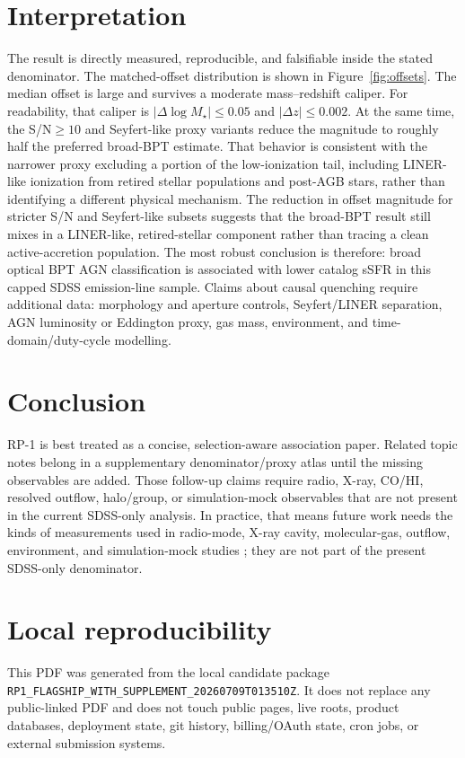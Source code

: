\documentclass[twocolumn]{aastex631}
\begin{document}
\section{Interpretation}
The result is directly measured, reproducible, and falsifiable inside the stated denominator. The matched-offset distribution is shown in Figure~\ref{fig:offsets}. The median offset is large and survives a moderate mass--redshift caliper. For readability, that caliper is $|\Delta\log M_\star|\leq0.05$ and $|\Delta z|\leq0.002$. At the same time, the S/N$\geq10$ and Seyfert-like proxy variants reduce the magnitude to roughly half the preferred broad-BPT estimate. That behavior is consistent with the narrower proxy excluding a portion of the low-ionization tail, including LINER-like ionization from retired stellar populations and post-AGB stars, rather than identifying a different physical mechanism. The reduction in offset magnitude for stricter S/N and Seyfert-like subsets suggests that the broad-BPT result still mixes in a LINER-like, retired-stellar component rather than tracing a clean active-accretion population. The most robust conclusion is therefore: broad optical BPT AGN classification is associated with lower catalog sSFR in this capped SDSS emission-line sample. Claims about causal quenching require additional data: morphology and aperture controls, Seyfert/LINER separation, AGN luminosity or Eddington proxy, gas mass, environment, and time-domain/duty-cycle modelling.

\section{Conclusion}
RP-1 is best treated as a concise, selection-aware association paper. Related topic notes belong in a supplementary denominator/proxy atlas until the missing observables are added. Those follow-up claims require radio, X-ray, CO/HI, resolved outflow, halo/group, or simulation-mock observables that are not present in the current SDSS-only analysis.
In practice, that means future work needs the kinds of measurements used in radio-mode, X-ray cavity, molecular-gas, outflow, environment, and simulation-mock studies \citep{best2005,dekel2006,fabian2012,heckmanbest2014,lamassa2013,mcnamara2007,veilleux2005,xcoldgass2017,xgass2018,cicone2014,carniani2017,fiore2017,simba2019,tng2019,eagle2015,peng2010,piotrowska2022,wetzel2013}; they are not part of the present SDSS-only denominator.

\section{Local reproducibility}
This PDF was generated from the local candidate package \texttt{RP1\_FLAGSHIP\_WITH\_SUPPLEMENT\_20260709T013510Z}. It does not replace any public-linked PDF and does not touch public pages, live roots, product databases, deployment state, git history, billing/OAuth state, cron jobs, or external submission systems.
\end{document}
